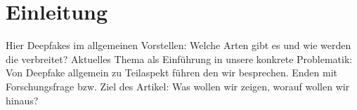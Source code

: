 \section{Einleitung}
Hier Deepfakes im allgemeinen Vorstellen: Welche Arten gibt es und wie werden die verbreitet?
Aktuelles Thema als Einführung in unsere konkrete Problematik: Von Deepfake allgemein zu Teilaspekt führen den wir besprechen.
Enden mit Forschungsfrage bzw. Ziel des Artikel: Was wollen wir zeigen, worauf wollen wir hinaus?